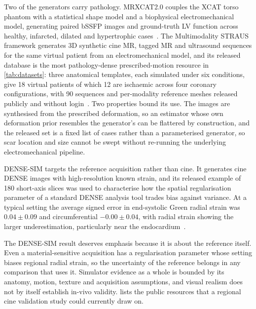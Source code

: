 Two of the generators carry pathology. MRXCAT2.0 couples the XCAT torso phantom with a statistical shape
model and a biophysical electromechanical model, generating paired bSSFP images and ground-truth LV
function across healthy, infarcted, dilated and hypertrophic cases~\citep{mrxcat2023}. The Multimodality
STRAUS framework generates 3D synthetic cine MR, tagged MR and ultrasound sequences for the same
virtual patient from an electromechanical model, and its released database is the most
pathology-dense prescribed-motion resource in \cref{tab:datasets}: three anatomical templates, each
simulated under six conditions, give 18 virtual patients of which 12 are ischaemic across four coronary
configurations, with 90 sequences and per-modality reference meshes released publicly and without
login~\citep{zhou2018straus}. Two properties bound its use. The images are synthesised from the
prescribed deformation, so an estimator whose own deformation prior resembles the generator's can be
flattered by construction, and the released set is a fixed list of cases rather than a parameterised
generator, so scar location and size cannot be swept without re-running the underlying
electromechanical pipeline.

DENSE-SIM targets the reference acquisition rather than cine. It generates cine DENSE images with
high-resolution known strain, and its released example of 180 short-axis slices was used to
characterise how the spatial regularisation parameter of a standard DENSE analysis tool trades bias
against variance. At a typical setting the average signed error in end-systolic Green radial strain
was $0.04\pm0.09$ and circumferential $-0.00\pm0.04$, with radial strain showing the larger
underestimation, particularly near the endocardium~\citep{barbaroux2025,densesimrepo}.

The DENSE-SIM result deserves emphasis because it is about the reference itself. Even a
material-sensitive acquisition has a regularisation parameter whose setting biases regional radial
strain, so the uncertainty of the reference belongs in any comparison that uses it. Simulator
evidence as a whole is bounded by its anatomy, motion, texture and acquisition assumptions, and
visual realism does not by itself establish in-vivo validity.  lists the public
resources that a regional cine validation study could currently draw on.

